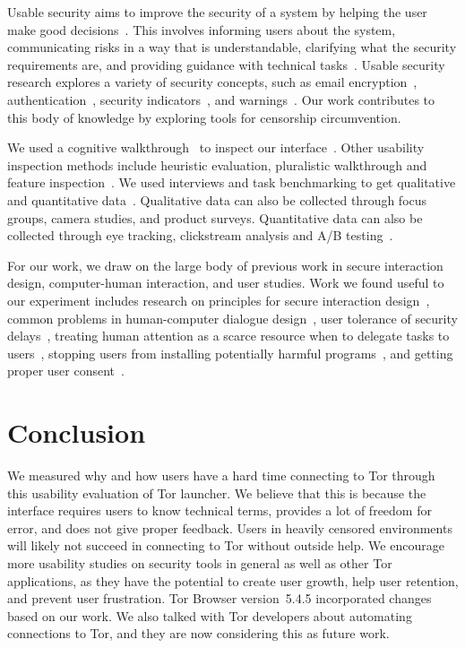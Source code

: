 \documentclass[USenglish,oneside,twocolumn]{article}
\begin{document}
Usable security aims to improve the security of a system by helping the user make good decisions~\cite{payne2008brief}. This involves informing users about the system, communicating risks in a way that is understandable, clarifying what the security requirements are, and providing guidance with technical tasks~\cite{adams1999users}. Usable security research explores a variety of security concepts, such as email encryption~\cite{whitten1999johnny,garfinkel2005johnny}, authentication~\cite{morris1979password,dhamija2000deja,suo2005graphical}, security indicators~\cite{dhamija2006phishing,akhawe2013alice}, and warnings~\cite{schechter2007emperor,egelman2008you}. Our work contributes to this body of knowledge by exploring tools for censorship circumvention.

We used a cognitive walkthrough~\cite{wharton1994cognitive,cognitive-walkthrough} to inspect our interface~\cite{nielsen1994usability}. Other usability inspection methods include heuristic evaluation, pluralistic walkthrough and feature inspection~\cite{inspection}. We used interviews and task benchmarking to get qualitative and quantitative data~\cite{krol2016towards}. Qualitative data can also be collected through focus groups, camera studies, and product surveys. Quantitative data can also be collected through eye tracking, clickstream analysis and A/B testing~\cite{ux-methods}. 
 
For our work, we draw on the large body of previous work in secure interaction design, computer-human interaction, and user studies. Work we found useful to our experiment includes research on principles for secure interaction design~\cite{yee2002user}, common problems in human-computer dialogue design~\cite{molich1990improving}, user tolerance of security delays~\cite{egelmanplease}, treating human attention as a scarce resource when to delegate tasks to users~\cite{bohme2011security}, stopping users from installing potentially harmful programs~\cite{good2007noticing}, and getting proper user consent~\cite{bohme2010trained}. 

\section{Conclusion} 
\label{sec:conclusion}
We measured why and how users have a hard time connecting to Tor through this usability evaluation of Tor launcher. We believe that this is because the interface requires users to know technical terms, provides a lot of freedom for error, and does not give proper feedback. Users in heavily censored environments will likely not succeed in connecting to Tor without outside help. We encourage more usability studies on security tools in general as well as other Tor applications, as they have the potential to create user growth, help user retention, and prevent user frustration. Tor Browser version~5.4.5 incorporated  changes based on our work. We also talked with Tor developers about automating connections to Tor, and they are now considering this as future work. 
\end{document}
